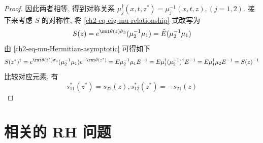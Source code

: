\begin{proof}
    因此两者相等, 得到对称关系 $ \mu_{j}^{\dagger}(x,t,z^{*}) = \mu_{j}^{-1}(x,t,z), (j = 1,2) $. 接下来考虑 $ S $ 的对称性, 将 \eqref{ch2-eq-eig-mu-relationship} 式改写为
    \begin{equation}
        S(z) = e^{\rmi \theta(z) \hat{\sigma}_{3}} (\mu_{2}^{-1}\mu_{1}) = \hat{E}(\mu_{2}^{-1}\mu_{1})
    \end{equation}
    由 \eqref{ch2-eq-mu-Hermitian-asymptotic} 可得如下
    \begin{equation}
        S(z^{*})^{\dagger} = e^{\rmi \theta(z^{*}) \sigma_{3}} (\mu_{2}^{-1}\mu_{1})  e^{-\rmi \theta(z^{*})} = E \mu_{2}^{-1}\mu_{1} E^{-1} = E \mu_{1}^{\dagger} (\mu_{2}^{-1})^{\dagger} E^{-1} = E \mu_{1}^{\dagger} \mu_{2} E^{-1} = S(z)^{-1}
    \end{equation}
    比较对应元素, 有
    \begin{equation}
        s_{11}^{*}(z^{*}) = s_{22}(z), s_{12}^{*}(z^{*}) = - s_{21}(z) \label{ch2-eq-S-symmetry}
    \end{equation}
\end{proof}

\section{相关的 RH 问题}

